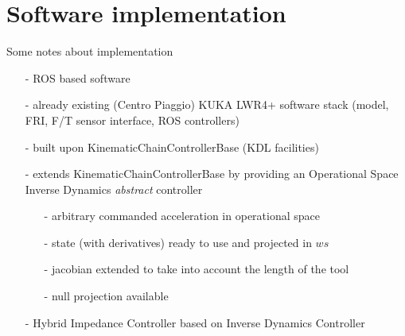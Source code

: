 \section{Software implementation}
\begin{frame}{Some notes about implementation}
  \begin{itemize}
  \item[-] ROS based software
  \item[-] already existing (Centro Piaggio) KUKA LWR4+ software stack (model, FRI, F/T sensor interface, ROS controllers)
  \item[-] built upon KinematicChainControllerBase (KDL facilities)
  \item[-] extends KinematicChainControllerBase by providing an Operational Space Inverse Dynamics \emph{abstract} controller
    \begin{itemize}
    \item[-] arbitrary commanded acceleration in operational space
    \item[-] state (with derivatives) ready to use and projected in $ws$
    \item[-] jacobian extended to take into account the length of the tool
    \item[-] null projection available
    \end{itemize}
  \item[-] Hybrid Impedance Controller based on Inverse Dynamics Controller
  \end{itemize}
\end{frame}
